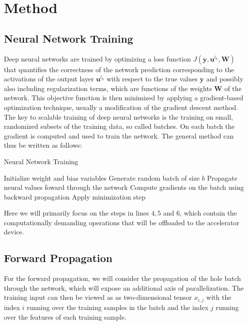 \documentclass[a4paper,11pt,bibtotoc,xcolor=dvipsnames]{scrartcl}
\begin{document}
\section{Method}

\subsection{Neural Network Training}

Deep neural networks are trained by optimizing a loss function $J\left
( \mathbf{y},\mathbf{u}^{l_h},\mathbf{W} \right )$ that quantifies the
correctness of the network prediction corresponding to the activations
of the output layer $\mathbf{u}^{l_h}$ with respect to the true values
$\mathbf{y}$ and possibly also including regularization terms, which
are functions of the weights $\mathbf{W}$ of the network. This
objective function is then minimized by applying a gradient-based
optimization technique, usually a modification of the gradient descent
method. The key to scalable training of deep neural networks is the
training on small, randomized subsets of the training data, so called
batches. On each batch the gradient is computed and used to train the
network. The general method can thus be written as follows:

\begin{algorithm}
  \caption{Neural Network Training} \label{alg:gn}
\begin{algorithmic}[1]
  \State Initialize weight and bias variables
  \Repeat
  \State Generate random batch of size $b$
  \State Propagate neural values foward through the network
  \State Compute gradients on the batch using backward propagation
  \State Apply minimization step
\end{algorithmic}
\end{algorithm}

Here we will primarily focus on the steps in lines $4,5$ and $6$, which contain the
computationally demanding operations that will be offloaded to the accelerator device.

\subsection{Forward Propagation}

For the forward propagation, we will consider the propagation of the hole batch
through the network, which will expose an additional axis of parallelization.
The training input can then be viewed as as two-dimensional tensor $x_{i,j}$ with
the index $i$ running over the training samples in the batch and the index $j$
running over the features of each training sample.
\end{document}
